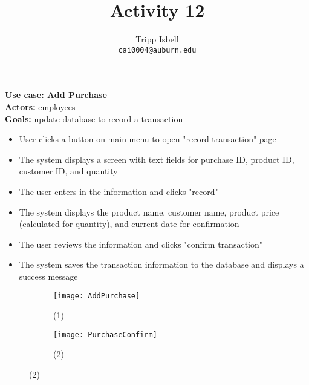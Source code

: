 \documentclass[notitlepage,11pt]{report}
\title{Activity 12}
\author{Tripp Isbell\\
	\texttt{cai0004@auburn.edu}}
\date{}
\begin{document}
\maketitle

\textbf{Use case: Add Purchase}\\
\textbf{Actors:} employees\\
\textbf{Goals:} update database to record a transaction\\

\begin{itemize}
	\item User clicks a button on main menu to open "record transaction" page
	\item The system displays a screen with text fields for purchase ID, product ID, customer ID, and quantity
	\item The user enters in the information and clicks "record"
	\item The system displays the product name, customer name, product price (calculated for quantity), and current date for confirmation
	\item The user reviews the information and clicks "confirm transaction"
	\item The system saves the transaction information to the database and displays a success message
\end{itemize}

\begin{figure}[h]
	\begin{subfigure}{.5\textwidth}
	\centering
	\texttt{[image: AddPurchase]}
	\caption{(1)}
	\end{subfigure}%
	\begin{subfigure}{.5\textwidth}
	\centering
	\texttt{[image: PurchaseConfirm]}
	\caption{(2)}
	\end{subfigure}
\end{figure}
\end{document}
